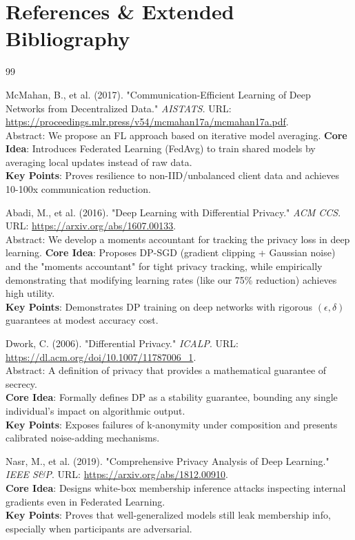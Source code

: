 \documentclass[10pt, a4paper, twocolumn]{article}
\begin{document}
\section{References \& Extended Bibliography}
\begin{thebibliography}{99}

 McMahan, B., et al. (2017). "Communication-Efficient Learning of Deep Networks from Decentralized Data." \textit{AISTATS}. URL: \url{https://proceedings.mlr.press/v54/mcmahan17a/mcmahan17a.pdf}. \\ Abstract: We propose an FL approach based on iterative model averaging.
\textbf{Core Idea}: Introduces Federated Learning (FedAvg) to train shared models by averaging local updates instead of raw data. \\
\textbf{Key Points}: Proves resilience to non-IID/unbalanced client data and achieves 10-100x communication reduction.

 Abadi, M., et al. (2016). "Deep Learning with Differential Privacy." \textit{ACM CCS}. URL: \url{https://arxiv.org/abs/1607.00133}. \\ Abstract: We develop a moments accountant for tracking the privacy loss in deep learning.
\textbf{Core Idea}: Proposes DP-SGD (gradient clipping + Gaussian noise) and the "moments accountant" for tight privacy tracking, while empirically demonstrating that modifying learning rates (like our 75\% reduction) achieves high utility. \\
\textbf{Key Points}: Demonstrates DP training on deep networks with rigorous $(\epsilon, \delta)$ guarantees at modest accuracy cost.

 Dwork, C. (2006). "Differential Privacy." \textit{ICALP}. URL: \url{https://dl.acm.org/doi/10.1007/11787006_1}. \\ Abstract: A definition of privacy that provides a mathematical guarantee of secrecy. \\
\textbf{Core Idea}: Formally defines DP as a stability guarantee, bounding any single individual's impact on algorithmic output. \\
\textbf{Key Points}: Exposes failures of k-anonymity under composition and presents calibrated noise-adding mechanisms.

 Nasr, M., et al. (2019). "Comprehensive Privacy Analysis of Deep Learning." \textit{IEEE S\&P}. URL: \url{https://arxiv.org/abs/1812.00910}. \\
\textbf{Core Idea}: Designs white-box membership inference attacks inspecting internal gradients even in Federated Learning. \\
\textbf{Key Points}: Proves that well-generalized models still leak membership info, especially when participants are adversarial.


\end{thebibliography}
\end{document}
